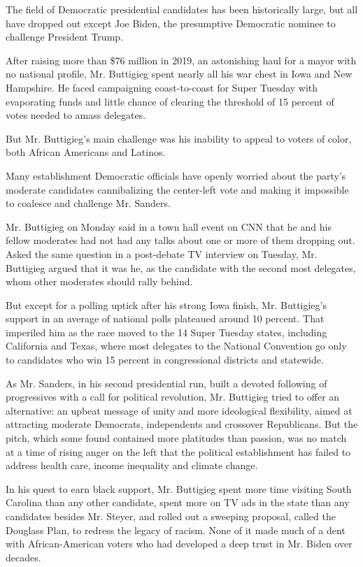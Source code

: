 The field of Democratic presidential candidates has been historically
large, but all have dropped out except Joe Biden, the presumptive
Democratic nominee to challenge President Trump.

After raising more than \$76 million in 2019, an astonishing haul for a
mayor with no national profile, Mr. Buttigieg spent nearly all his war
chest in Iowa and New Hampshire. He faced campaigning coast-to-coast for
Super Tuesday with evaporating funds and little chance of clearing the
threshold of 15 percent of votes needed to amass delegates.

But Mr. Buttigieg's main challenge was his inability to appeal to voters
of color, both African Americans and Latinos.

Many establishment Democratic officials have openly worried about the
party's moderate candidates cannibalizing the center-left vote and
making it impossible to coalesce and challenge Mr. Sanders.

Mr. Buttigieg on Monday said in a town hall event on CNN that he and his
fellow moderates had not had any talks about one or more of them
dropping out. Asked the same question in a post-debate TV interview on
Tuesday, Mr. Buttigieg argued that it was he, as the candidate with the
second most delegates, whom other moderates should rally behind.

But except for a polling uptick after his strong Iowa finish, Mr.
Buttigieg's support in an average of national polls plateaued around 10
percent. That imperiled him as the race moved to the 14 Super Tuesday
states, including California and Texas, where most delegates to the
National Convention go only to candidates who win 15 percent in
congressional districts and statewide.

As Mr. Sanders, in his second presidential run, built a devoted
following of progressives with a call for political revolution, Mr.
Buttigieg tried to offer an alternative: an upbeat message of unity and
more ideological flexibility, aimed at attracting moderate Democrats,
independents and crossover Republicans. But the pitch, which some found
contained more platitudes than passion, was no match at a time of rising
anger on the left that the political establishment has failed to address
health care, income inequality and climate change.

In his quest to earn black support, Mr. Buttigieg spent more time
visiting South Carolina than any other candidate, spent more on TV ads
in the state than any candidates besides Mr. Steyer, and rolled out a
sweeping proposal, called the Douglass Plan, to redress the legacy of
racism. None of it made much of a dent with African-American voters who
had developed a deep trust in Mr. Biden over decades.

